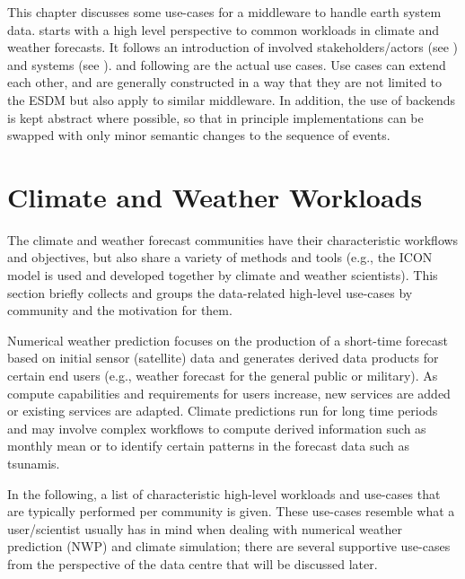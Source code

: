 
\begin{chapterIntro}
This chapter discusses some use-cases for a middleware to handle earth system data.
 starts with a high level perspective to common workloads in climate and weather forecasts.
It follows an introduction of involved stakeholders/actors (see ) and systems (see ).
 and following are the actual use cases.
Use cases can extend each other, and are generally constructed in a way that they are not limited to the ESDM but also apply to similar middleware.
In addition, the use of backends is kept abstract where possible, so that in principle implementations can be swapped with only minor semantic changes to the sequence of events.
\end{chapterIntro}



\section{Climate and Weather Workloads}
\label{sec:use cases/climate and weather}

The climate and weather forecast communities have their characteristic workflows and objectives, but also share a variety of methods and tools (e.g., the ICON model is used and developed together by climate and weather scientists).
This section briefly collects and groups the data-related high-level use-cases by community and the motivation for them.

Numerical weather prediction focuses on the production of a short-time forecast based on initial sensor (satellite) data and generates derived data products for certain end users (e.g., weather forecast for the general public or military).
As compute capabilities and requirements for users increase, new services are added or existing services are adapted.
Climate predictions run for long time periods and may involve complex workflows to compute derived information such as monthly mean or to identify certain patterns in the forecast data such as tsunamis.

In the following, a list of characteristic high-level workloads and use-cases that are typically performed per community is given.
These use-cases resemble what a user/scientist usually has in mind when dealing with numerical weather prediction (NWP) and climate simulation; there are several supportive use-cases from the perspective of the data centre that will be discussed later.


